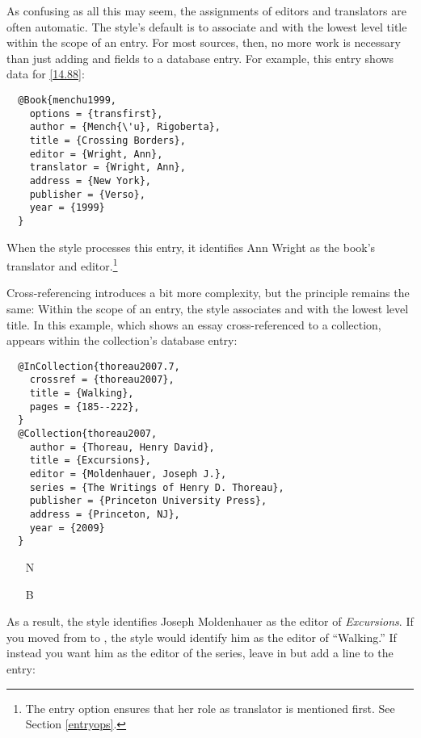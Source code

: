 \documentclass[11pt,letterpaper,oneside]{article}
\begin{document}
As confusing as all this may seem, the assignments of editors and
translators are often automatic. The style's default is to associate
 and  with the lowest level
title within the scope of an entry. For most sources, then, no more
work is necessary than just adding  and
 fields to a database entry. For example, this
entry shows data for \ref{14.88}:

\begin{lstlisting}
  @Book{menchu1999,
    options = {transfirst},
    author = {Mench{\'u}, Rigoberta},
    title = {Crossing Borders},
    editor = {Wright, Ann},
    translator = {Wright, Ann},
    address = {New York},
    publisher = {Verso},
    year = {1999}
  }
\end{lstlisting}

\noindent When the style processes this entry, it identifies Ann
Wright as the book's translator and editor.\footnote{The entry option
 ensures that her role as translator is mentioned
first. See Section \ref{entryops}.}

Cross-referencing introduces a bit more complexity, but the principle
remains the same: Within the scope of an entry, the style associates
 and  with the lowest level
title. In this example, which shows an essay cross-referenced to a
collection,  appears within the collection's database
entry:

\begin{lstlisting}
  @InCollection{thoreau2007.7,
    crossref = {thoreau2007},
    title = {Walking},
    pages = {185--222},
  }
  @Collection{thoreau2007,
    author = {Thoreau, Henry David},
    title = {Excursions},
    editor = {Moldenhauer, Joseph J.},
    series = {The Writings of Henry D. Thoreau},
    publisher = {Princeton University Press},
    address = {Princeton, NJ},
    year = {2009}
  }
\end{lstlisting}

\begin{itemize}
\item[N] 

\item[B] 
\end{itemize}

\noindent As a result, the style identifies Joseph Moldenhauer as the
editor of \textit{Excursions}. If you moved  from
 to , the
style would identify him as the editor of ``Walking.'' If instead you
want him as the editor of the series, leave  in
 but add a line to the entry:
\end{document}
